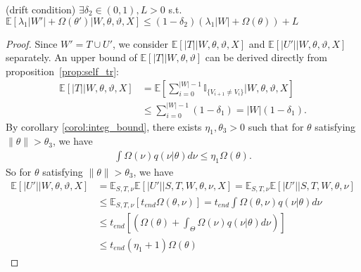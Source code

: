 \begin{lemma}(drift condition) $\exists \delta_2 \in (0, 1), L > 0$
  s.t.
  $\mathbb{E}\left[\lambda_1|W'| + \Omega(\theta')  | W, \theta, \vartheta, X\right]
  \leq (1 - \delta_2)\left(\lambda_1|W| + \Omega(\theta)   \right) + L$ %
\label{lem:drift}
\end{lemma}
\begin{proof}
Since $W'=T\cup U'$, we consider $\mathbb{E}[|T| |W,\theta,\vartheta,X]$
and $\mathbb{E}[|U'| | W, \theta, \vartheta, X]$ separately.
An upper bound of $\mathbb{E}[|T| | W,\theta,\vartheta]$ can be derived
directly from proposition~\ref{prop:self_tr}:
\begin{align*}
\mathbb{E}[|T| |W,\theta,\vartheta,X] &= \mathbb{E}[\sum_{i = 0}^{|W|-1}
  \mathbb{I}_{\{ V_{i + 1} \neq V_i \}}| W, \theta, \vartheta, X]\\
&\leq \sum_{i = 0}^{|W| - 1} (1 - \delta_1) = |W|(1 - \delta_1).
\end{align*}
By corollary \ref{corol:integ_bound}, there exists $\eta_1 , \theta_3 > 0$ such that for $\theta$  satisfying $ \| \theta \| > \theta_3$, we have
\begin{align*}
\int \Omega(\nu) q(\nu | \theta)d\nu \leq \eta_1 \Omega(\theta).
\end{align*}
So for $\theta$ satisfying $ \| \theta \| > \theta_3$, we have
\begin{align*}
\mathbb{E}[|U'| |W, \theta, \vartheta, X] &= \mathbb{E}_{S,T, \nu}\mathbb{E}[|U'| | S, T, W, \theta, \nu, X] = \mathbb{E}_{S,T, \nu}\mathbb{E}[|U'| | S, T, W, \theta, \nu] \\
& \leq \mathbb{E}_{S,T, \nu} \left[t_{end}\Omega(\theta, \nu)\right] = t_{end}\int \Omega(\theta, \nu) q(\nu | \theta) d\nu\\
& \leq t_{end} \left[ \left(  \Omega(\theta) +
\int_\Theta \Omega(\nu) q(\nu | \theta)d\nu \right) \right] \\
& \leq t_{end} (\eta_1 + 1) \Omega(\theta) %
\end{align*}



\end{proof}
